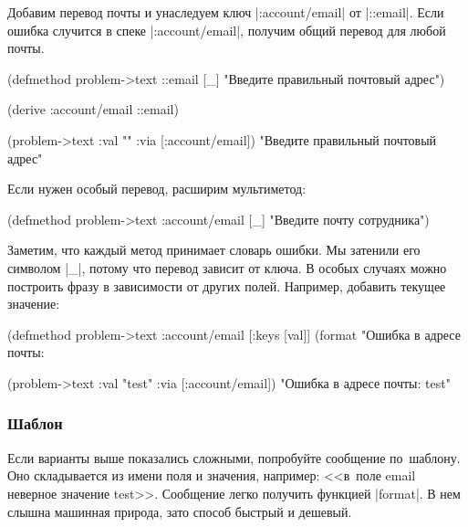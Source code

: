 Добавим перевод почты и унаследуем ключ \spverb|:account/email| от
\spverb|::email|. Если ошибка случится в спеке \spverb|:account/email|, получим
общий перевод для любой почты.


  \begin{clojure}
(defmethod problem->text ::email [_]
  "Введите правильный почтовый адрес")

(derive :account/email ::email)

(problem->text {:val "" :via [:account/email]})
"Введите правильный почтовый адрес"
  \end{clojure}

\noindent
Если нужен особый перевод, расширим мультиметод:

  \begin{clojure}
(defmethod problem->text :account/email [_]
  "Введите почту сотрудника")
  \end{clojure}

Заметим, что каждый метод принимает словарь ошибки. Мы затенили его символом
\spverb|_|, потому что перевод зависит от ключа. В особых случаях можно
построить фразу в зависимости от других полей. Например, добавить текущее
значение:

  \begin{clojure}
(defmethod problem->text :account/email
  [{:keys [val]}]
  (format "Ошибка в адресе почты: %

(problem->text {:val "test" :via [:account/email]})
"Ошибка в адресе почты: test"
  \end{clojure}

\subsubsection{Шаблон}


Если варианты выше показались сложными, попробуйте сообщение по~шаблону. Оно
складывается из имени поля и значения, например: <<в~поле email неверное
значение test>>. Сообщение легко получить функцией \spverb|format|. В нем слышна
машинная природа, зато способ быстрый и дешевый.

